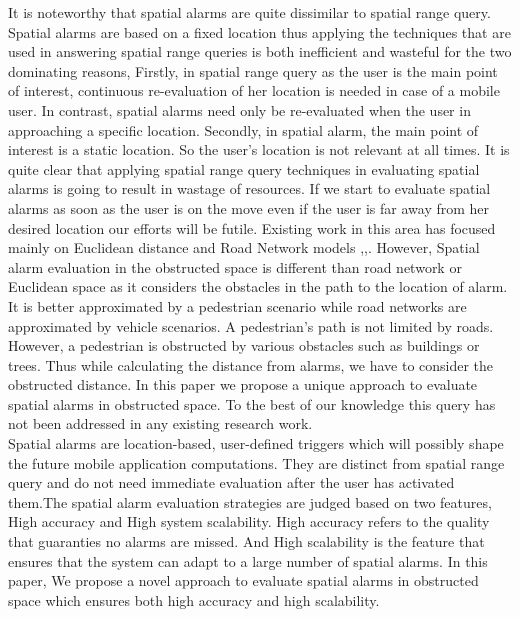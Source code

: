 It is noteworthy that spatial alarms are quite dissimilar to spatial range query. Spatial alarms are based on a fixed location thus applying the techniques that are used in answering spatial range queries is both inefficient and wasteful for the two dominating reasons, Firstly, in spatial range query as the user is the main point of interest, continuous re-evaluation of her location is needed in case of a mobile user. In contrast, spatial alarms need only be re-evaluated when the user in approaching a specific location. Secondly, in spatial alarm, the main point of interest is a static location. So the user's location is not relevant at all times. It is quite clear that applying spatial range query techniques in evaluating spatial alarms is going to result in wastage of resources. If we start to evaluate spatial alarms as soon as the user is on the move even if the user is far away from her desired location our efforts will be futile. 
\vspace*{10pt}
Existing work in this area has focused mainly on Euclidean distance and Road Network models \cite{bamba},\cite{roadalarm},\cite{liu}. However, Spatial alarm evaluation in the obstructed space is different than road network or Euclidean space as it considers the obstacles in the path to the location of alarm. It is better approximated by a pedestrian scenario while road networks are approximated by vehicle scenarios. A pedestrian's path is not limited by roads. However, a pedestrian is obstructed by various obstacles such as buildings or trees. Thus while calculating the distance from alarms, we have to consider the obstructed distance\cite{deberg}. In this paper we propose a unique approach to evaluate spatial alarms in obstructed space. To the best of our knowledge this query has not been addressed in any existing research work.\\
\vspace*{10pt}
Spatial alarms are location-based, user-defined triggers which will possibly shape the future mobile application computations. They are distinct from spatial range query and do not need immediate evaluation after the user has activated them.The spatial alarm evaluation strategies are judged based on two features, High accuracy and High system scalability. High accuracy refers to the quality that guaranties no alarms are missed. And High scalability is the feature that ensures that the system can adapt to a large number of spatial alarms.
In this paper, We propose a novel approach to evaluate spatial alarms in obstructed space which ensures both high accuracy and high scalability.
\vspace*{10pt}


